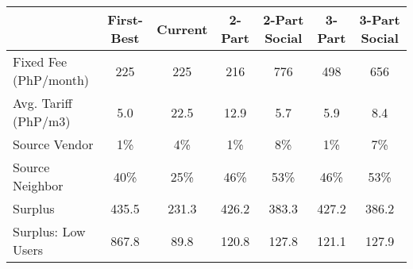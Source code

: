 \begin{tabular}{lcccccc}
  & First-Best & Current & 2-Part  & 2-Part Social  & 3-Part & 3-Part Social \\
\hline
\hline
Fixed Fee (PhP/month) &225&225&216&776&498&656\\
Avg. Tariff (PhP/m3) &5.0&22.5&12.9&5.7&5.9&8.4\\
Source Vendor &1\% &4\% &1\% &8\% &1\% &7\%\\
Source Neighbor &40\% &25\% &46\% &53\% &46\% &53\%\\
Surplus &435.5&231.3&426.2&383.3&427.2&386.2\\
Surplus: Low Users &867.8&89.8&120.8&127.8&121.1&127.9\\
\hline
\end{tabular}
